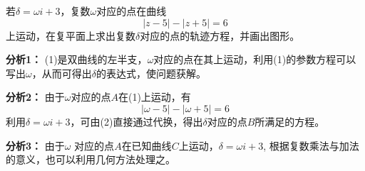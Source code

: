 \begin{example}
    若$\delta =\omega i+3$，复数$\omega$对应的点在曲线
\begin{equation}
    |z-5|-|z+5|=6 \tag{1}
\end{equation}
上运动，在复平面上求出复数$\delta$对应的点的轨迹方程，并画出图形。
\end{example}

\begin{analyze}
\textbf{分析1：}
(1)是双曲线的左半支，$\omega$对应的点在其上运动，利用(1)的参数方程可以写出$\omega$，从而可得出$\delta$的表达式，使问题获解。

\textbf{分析2：}  由于$\omega$对应的点$A$在(1)上运动，有
\begin{equation}
    |\omega -5|-|\omega+5|=6\tag{2}
\end{equation}
利用$\delta=\omega i+3$，可由(2)直接通过代换，得出$\delta$对应的点$B$所满足的方程。

\textbf{分析3：}
由于$\omega$ 对应的点$A$在已知曲线$C$上运动，$\delta =\omega i+3$, 根据复数乘法与加法的意义，也可以利用几何方法处理之。
\end{analyze}

